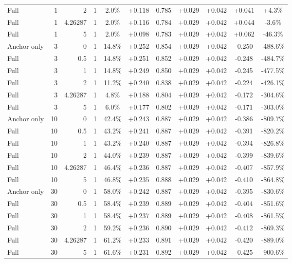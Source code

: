 \begin{table}[htbp]
\begin{tabular}{lrrrccccccc}
Full & 1 & 2 & 1 & 2.0\% & +0.118 & 0.785 & +0.029 & +0.042 & +0.041 & +4.3\% \\
Full & 1 & 4.26287 & 1 & 2.0\% & +0.116 & 0.784 & +0.029 & +0.042 & +0.044 & -3.6\% \\
Full & 1 & 5 & 1 & 2.0\% & +0.098 & 0.783 & +0.029 & +0.042 & +0.062 & -46.3\% \\
Anchor only & 3 & 0 & 1 & 14.8\% & +0.252 & 0.854 & +0.029 & +0.042 & -0.250 & -488.6\% \\
Full & 3 & 0.5 & 1 & 14.8\% & +0.251 & 0.852 & +0.029 & +0.042 & -0.248 & -484.7\% \\
Full & 3 & 1 & 1 & 14.8\% & +0.249 & 0.850 & +0.029 & +0.042 & -0.245 & -477.5\% \\
Full & 3 & 2 & 1 & 11.2\% & +0.240 & 0.838 & +0.029 & +0.042 & -0.224 & -426.1\% \\
Full & 3 & 4.26287 & 1 & 4.8\% & +0.188 & 0.804 & +0.029 & +0.042 & -0.172 & -304.6\% \\
Full & 3 & 5 & 1 & 6.0\% & +0.177 & 0.802 & +0.029 & +0.042 & -0.171 & -303.0\% \\
Anchor only & 10 & 0 & 1 & 42.4\% & +0.243 & 0.887 & +0.029 & +0.042 & -0.386 & -809.7\% \\
Full & 10 & 0.5 & 1 & 43.2\% & +0.241 & 0.887 & +0.029 & +0.042 & -0.391 & -820.2\% \\
Full & 10 & 1 & 1 & 43.2\% & +0.240 & 0.887 & +0.029 & +0.042 & -0.394 & -826.8\% \\
Full & 10 & 2 & 1 & 44.0\% & +0.239 & 0.887 & +0.029 & +0.042 & -0.399 & -839.6\% \\
Full & 10 & 4.26287 & 1 & 46.4\% & +0.236 & 0.887 & +0.029 & +0.042 & -0.407 & -857.9\% \\
Full & 10 & 5 & 1 & 46.8\% & +0.235 & 0.888 & +0.029 & +0.042 & -0.410 & -864.8\% \\
Anchor only & 30 & 0 & 1 & 58.0\% & +0.242 & 0.887 & +0.029 & +0.042 & -0.395 & -830.6\% \\
Full & 30 & 0.5 & 1 & 58.4\% & +0.239 & 0.889 & +0.029 & +0.042 & -0.404 & -851.6\% \\
Full & 30 & 1 & 1 & 58.4\% & +0.237 & 0.889 & +0.029 & +0.042 & -0.408 & -861.5\% \\
Full & 30 & 2 & 1 & 59.2\% & +0.236 & 0.890 & +0.029 & +0.042 & -0.412 & -869.3\% \\
Full & 30 & 4.26287 & 1 & 61.2\% & +0.233 & 0.891 & +0.029 & +0.042 & -0.420 & -889.0\% \\
Full & 30 & 5 & 1 & 61.6\% & +0.231 & 0.892 & +0.029 & +0.042 & -0.425 & -900.6\% \\

\end{tabular}
\end{table}
